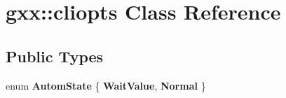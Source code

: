 \hypertarget{classgxx_1_1cliopts}{}\section{gxx\+:\+:cliopts Class Reference}
\label{classgxx_1_1cliopts}
\subsection*{Public Types}
\begin{DoxyCompactItemize}
\item 
enum {\bfseries Autom\+State} \{ {\bfseries Wait\+Value}, 
{\bfseries Normal}
 \}\hypertarget{classgxx_1_1cliopts_a3ab2bce5df9288c116ac00d1504cfeea}{}\label{classgxx_1_1cliopts_a3ab2bce5df9288c116ac00d1504cfeea}

\end{DoxyCompactItemize}
